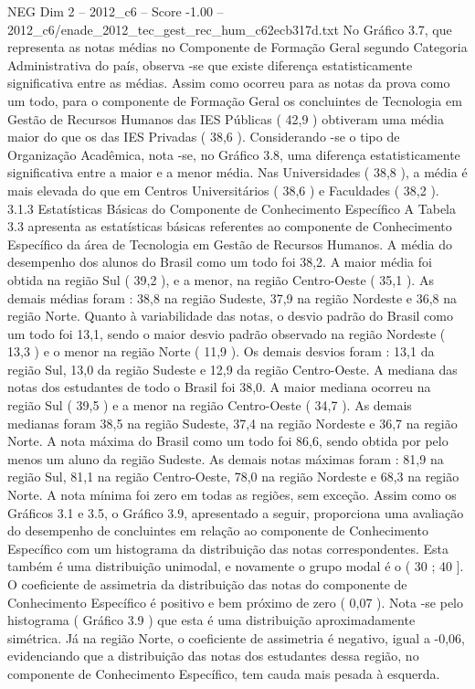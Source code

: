 \begin{textsample}{NEG Dim 2 – 2012\_c6 – Score -1.00 – 2012\_c6/enade\_2012\_tec\_gest\_rec\_hum\_c62ecb317d.txt}
No Gráfico 3.7, que representa as notas médias no Componente de Formação Geral segundo Categoria Administrativa do país, observa -se que existe diferença estatisticamente significativa entre as médias.
Assim como ocorreu para as notas da prova como um todo, para o componente de Formação Geral os concluintes de Tecnologia em Gestão de Recursos Humanos das IES Públicas ( 42,9 ) obtiveram uma média maior do que os das IES Privadas ( 38,6 ).
Considerando -se o tipo de Organização Acadêmica, nota -se, no Gráfico 3.8, uma diferença estatisticamente significativa entre a maior e a menor média.
Nas Universidades ( 38,8 ), a média é mais elevada do que em Centros Universitários ( 38,6 ) e Faculdades ( 38,2 ). 3.1.3 Estatísticas Básicas do Componente de Conhecimento Específico A Tabela 3.3 apresenta as estatísticas básicas referentes ao componente de Conhecimento Específico da área de Tecnologia em Gestão de Recursos Humanos.
A média do desempenho dos alunos do Brasil como um todo foi 38,2.
A maior média foi obtida na região Sul ( 39,2 ), e a menor, na região Centro-Oeste ( 35,1 ).
As demais médias foram : 38,8 na região Sudeste, 37,9 na região Nordeste e 36,8 na região Norte.
Quanto à variabilidade das notas, o desvio padrão do Brasil como um todo foi 13,1, sendo o maior desvio padrão observado na região Nordeste ( 13,3 ) e o menor na região Norte ( 11,9 ).
Os demais desvios foram : 13,1 da região Sul, 13,0 da região Sudeste e 12,9 da região Centro-Oeste.
A mediana das notas dos estudantes de todo o Brasil foi 38,0.
A maior mediana ocorreu na região Sul ( 39,5 ) e a menor na região Centro-Oeste ( 34,7 ).
As demais medianas foram 38,5 na região Sudeste, 37,4 na região Nordeste e 36,7 na região Norte.
A nota máxima do Brasil como um todo foi 86,6, sendo obtida por pelo menos um aluno da região Sudeste.
As demais notas máximas foram : 81,9 na região Sul, 81,1 na região Centro-Oeste, 78,0 na região Nordeste e 68,3 na região Norte.
A nota mínima foi zero em todas as regiões, sem exceção.
Assim como os Gráficos 3.1 e 3.5, o Gráfico 3.9, apresentado a seguir, proporciona uma avaliação do desempenho de concluintes em relação ao componente de Conhecimento Específico com um histograma da distribuição das notas correspondentes.
Esta também é uma distribuição unimodal, e novamente o grupo modal é o ( 30 ; 40 ].
O coeficiente de assimetria da distribuição das notas do componente de Conhecimento Específico é positivo e bem próximo de zero ( 0,07 ).
Nota -se pelo histograma ( Gráfico 3.9 ) que esta é uma distribuição aproximadamente simétrica.
Já na região Norte, o coeficiente de assimetria é negativo, igual a -0,06, evidenciando que a distribuição das notas dos estudantes dessa região, no componente de Conhecimento Específico, tem cauda mais pesada à esquerda.

\end{textsample}
